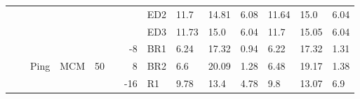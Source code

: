 {\begin{minipage}{\linewidth}
\begin{tabular}{l|l|l|l|c|c|r|l|lll|lll}
                                              &                                          &                                           &                                           &                                            &                                                                                         &                                                                                                & ED2                                       & 11.7  & 14.81 & 6.08      & 11.64 & 15.0  & 6.04       \\
                                              &                                          &                                           &                                           &                                            &                                                                                         &                                                                                                & ED3                                       & 11.73 & 15.0  & 6.04      & 11.7  & 15.05 & 6.04       \\
  \cline{3-5}\cline{7-14}
                                              &                                          & \multirow{16}{*}{Ping}                    & \multirow{8}{*}{MCM}                      & \multirow{16}{*}{50}                       &                                                                                         & -8                                                                                             & BR1                                       & 6.24  & 17.32 & 0.94      & 6.22  & 17.32 & 1.31       \\
                                              &                                          &                                           &                                           &                                            &                                                                                         & 8                                                                                              & BR2                                       & 6.6   & 20.09 & 1.28      & 6.48  & 19.17 & 1.38       \\
                                              &                                          &                                           &                                           &                                            &                                                                                         & -16                                                                                            & R1                                        & 9.78  & 13.4  & 4.78      & 9.8   & 13.07 & 6.9        \\

\end{tabular}
\end{minipage}}
